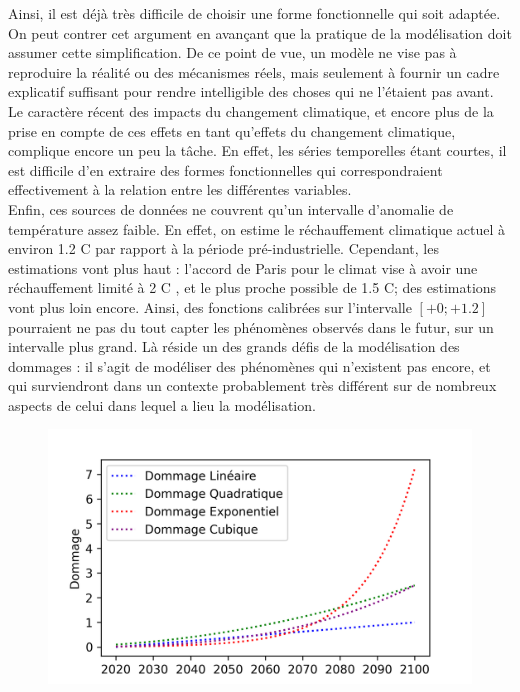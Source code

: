 Ainsi, il est déjà très difficile de choisir une forme fonctionnelle qui soit adaptée. On peut contrer cet argument en avançant que la pratique de la modélisation doit assumer cette simplification. De ce point de vue, un modèle ne vise pas à reproduire la réalité ou des mécanismes réels, mais seulement à fournir un cadre explicatif suffisant pour rendre intelligible des choses qui ne l'étaient pas avant. \\

Le caractère récent des impacts du changement climatique, et encore plus de la prise en compte de ces effets en tant qu'effets du changement climatique, complique encore un peu la tâche. En effet, les séries temporelles étant courtes, il est difficile d'en extraire des formes fonctionnelles qui correspondraient effectivement à la relation entre les différentes variables. \\

Enfin, ces sources de données ne couvrent qu'un intervalle d'anomalie de température assez faible. En effet, on estime le réchauffement climatique actuel à environ 1.2 \textdegree C par rapport à la période pré-industrielle. Cependant, les estimations vont plus haut : l'accord de Paris pour le climat vise à avoir une réchauffement limité à 2 \textdegree C , et le plus proche possible de 1.5 \textdegree C; des estimations vont plus loin encore. Ainsi, des fonctions calibrées sur l'intervalle $[+0; +1.2]$ pourraient ne pas du tout capter les phénomènes observés dans le futur, sur un intervalle plus grand. Là réside un des grands défis de la modélisation des dommages : il s'agit de modéliser des phénomènes qui n'existent pas encore, et qui surviendront dans un contexte probablement très différent sur de nombreux aspects de celui dans lequel a lieu la modélisation. 



\begin{figure}[ht]
\centering
\includegraphics[width=\textwidth]{results/shape.png}
\end{figure}


